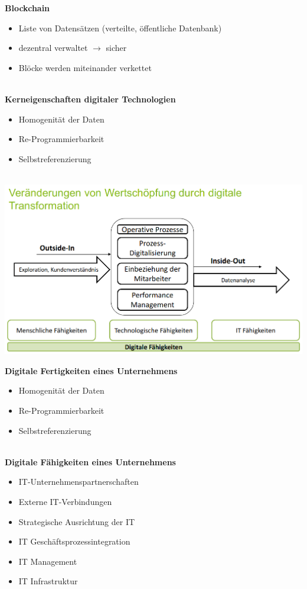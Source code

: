 \documentclass[a4]{scrartcl}
\begin{document}
\textbf{Blockchain}
\begin{itemize}
\item Liste von Datensätzen (verteilte, öffentliche Datenbank)
\item dezentral verwaltet $\rightarrow$ sicher
\item Blöcke werden miteinander verkettet
\end{itemize}

\ \\

\textbf{Kerneigenschaften digitaler Technologien}
\begin{itemize}
\item Homogenität der Daten
\item Re-Programmierbarkeit
\item Selbstreferenzierung
\end{itemize}
 \ \\

\includegraphics[scale=0.3]{veraenderung.png}


\newpage

\textbf{Digitale Fertigkeiten eines Unternehmens}
\begin{itemize}
\item Homogenität der Daten
\item Re-Programmierbarkeit
\item Selbstreferenzierung
\end{itemize}
 \ \\
 
 
\textbf{Digitale Fähigkeiten eines Unternehmens}
\begin{itemize}
\item IT-Unternehmenspartnerschaften
\item Externe IT-Verbindungen
\item Strategische Ausrichtung der IT
\item IT Geschäftsprozessintegration
\item IT Management
\item IT Infrastruktur
\end{itemize}
 
\end{document}
